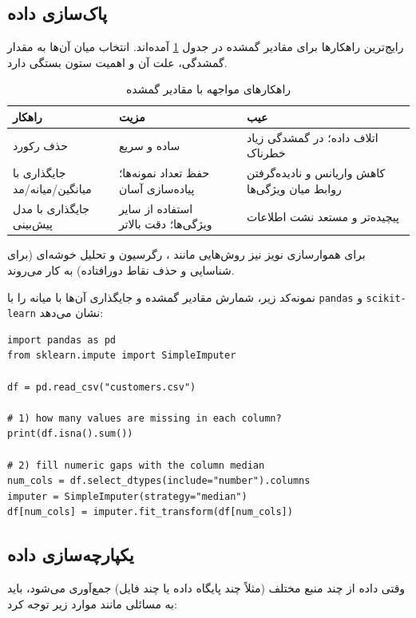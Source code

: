 \subsection{پاک‌سازی داده}

رایج‌ترین راهکارها برای مقادیر گمشده در جدول \ref{tab:missing-strategies}
آمده‌اند. انتخاب میان آن‌ها به مقدار گمشدگی، علت آن و اهمیت ستون بستگی دارد.

\begin{table}[htbp]
\centering
\caption{راهکارهای مواجهه با مقادیر گمشده}
\label{tab:missing-strategies}
\begin{tabular}{@{}p{2.9cm}p{4.5cm}p{4.3cm}@{}}
\toprule
\textbf{راهکار} & \textbf{مزیت} & \textbf{عیب} \\
\midrule
حذف رکورد & ساده و سریع & اتلاف داده؛ در گمشدگی زیاد خطرناک \\
\addlinespace
جایگذاری با میانگین/میانه/مد & حفظ تعداد نمونه‌ها؛ پیاده‌سازی آسان & کاهش واریانس و نادیده‌گرفتن روابط میان ویژگی‌ها \\
\addlinespace
جایگذاری با مدل پیش‌بینی & استفاده از سایر ویژگی‌ها؛ دقت بالاتر & پیچیده‌تر و مستعد نشت اطلاعات \\
\bottomrule
\end{tabular}
\end{table}

برای هموارسازی نویز نیز روش‌هایی مانند ،
رگرسیون و تحلیل خوشه‌ای (برای شناسایی و حذف نقاط دورافتاده) به کار می‌روند.

نمونه‌کد زیر، شمارش مقادیر گمشده و جایگذاری آن‌ها با میانه را با
\texttt{pandas} و \texttt{scikit-learn} نشان می‌دهد:

\begin{lstlisting}
import pandas as pd
from sklearn.impute import SimpleImputer

df = pd.read_csv("customers.csv")

# 1) how many values are missing in each column?
print(df.isna().sum())

# 2) fill numeric gaps with the column median
num_cols = df.select_dtypes(include="number").columns
imputer = SimpleImputer(strategy="median")
df[num_cols] = imputer.fit_transform(df[num_cols])
\end{lstlisting}

\subsection{یکپارچه‌سازی داده}

وقتی داده از چند منبع مختلف (مثلاً چند پایگاه داده یا چند فایل) جمع‌آوری
می‌شود، باید به مسائلی مانند موارد زیر توجه کرد:

